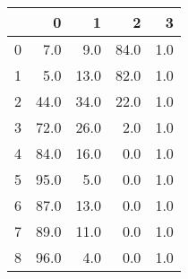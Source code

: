 \begin{tabular}{lrrrr}
\toprule
{} &     0 &     1 &     2 &    3 \\
\midrule
0 &   7.0 &   9.0 &  84.0 &  1.0 \\
1 &   5.0 &  13.0 &  82.0 &  1.0 \\
2 &  44.0 &  34.0 &  22.0 &  1.0 \\
3 &  72.0 &  26.0 &   2.0 &  1.0 \\
4 &  84.0 &  16.0 &   0.0 &  1.0 \\
5 &  95.0 &   5.0 &   0.0 &  1.0 \\
6 &  87.0 &  13.0 &   0.0 &  1.0 \\
7 &  89.0 &  11.0 &   0.0 &  1.0 \\
8 &  96.0 &   4.0 &   0.0 &  1.0 \\
\bottomrule
\end{tabular}
